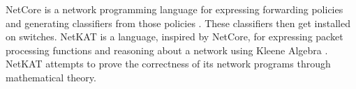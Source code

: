 NetCore is a network programming language for expressing forwarding policies and
generating classifiers from those policies \cite{monsanto2012netcore}. These
classifiers then get installed on switches. NetKAT is a language, inspired by
NetCore, for expressing packet processing functions and reasoning about a
network using Kleene Algebra \cite{kozen2014netkat, anderson2014netkat}. NetKAT
attempts to prove the correctness of its network programs through mathematical theory.
